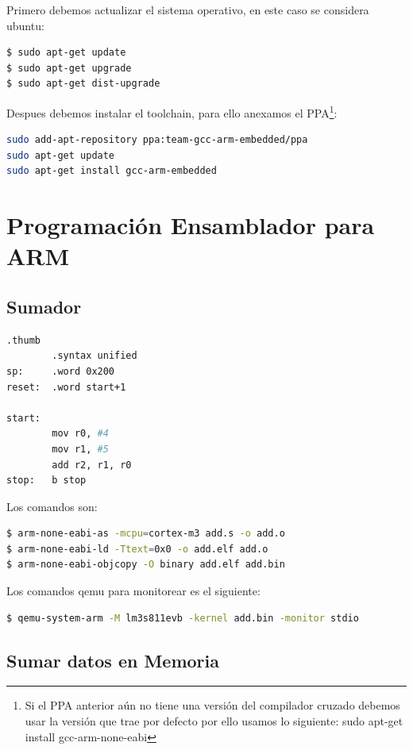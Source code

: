 \documentclass[12pt, twoside]{report}
\begin{document}
Primero debemos actualizar el sistema operativo, en este caso se considera ubuntu:

\begin{lstlisting}[language=bash]
$ sudo apt-get update
$ sudo apt-get upgrade
$ sudo apt-get dist-upgrade
\end{lstlisting}

Despues debemos instalar el toolchain, para ello anexamos el PPA\footnote{Si el PPA anterior aún no tiene una versión del compilador cruzado debemos usar la versión que trae por defecto por ello usamos lo siguiente:
sudo apt-get install gcc-arm-none-eabi
}:

\begin{lstlisting}[language=bash]
sudo add-apt-repository ppa:team-gcc-arm-embedded/ppa
sudo apt-get update
sudo apt-get install gcc-arm-embedded
\end{lstlisting}

 \section{Programación Ensamblador para ARM}
 
 \subsection{Sumador}

\begin{lstlisting}[language=bash]
		.thumb
		.syntax unified
sp:		.word 0x200
reset:	.word start+1

start:
		mov r0, #4
		mov r1, #5
		add r2, r1, r0
stop:	b stop
\end{lstlisting} 

Los comandos son:

\begin{lstlisting}[language=bash]
$ arm-none-eabi-as -mcpu=cortex-m3 add.s -o add.o
$ arm-none-eabi-ld -Ttext=0x0 -o add.elf add.o
$ arm-none-eabi-objcopy -O binary add.elf add.bin
\end{lstlisting} 

Los comandos qemu para monitorear es el siguiente:

\begin{lstlisting}[language=bash]
$ qemu-system-arm -M lm3s811evb -kernel add.bin -monitor stdio
\end{lstlisting} 

\subsection{Sumar datos en Memoria}
\end{document}
